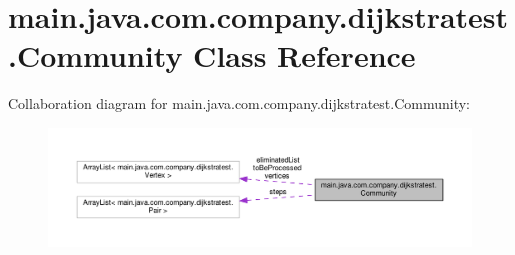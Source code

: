 \hypertarget{classmain_1_1java_1_1com_1_1company_1_1dijkstratest_1_1_community}{\section{main.\-java.\-com.\-company.\-dijkstratest.\-Community Class Reference}
\label{classmain_1_1java_1_1com_1_1company_1_1dijkstratest_1_1_community}
}


Collaboration diagram for main.\-java.\-com.\-company.\-dijkstratest.\-Community\-:
\nopagebreak
\begin{figure}[H]
\begin{center}
\leavevmode
\includegraphics[width=350pt]{classmain_1_1java_1_1com_1_1company_1_1dijkstratest_1_1_community__coll__graph}
\end{center}
\end{figure}
